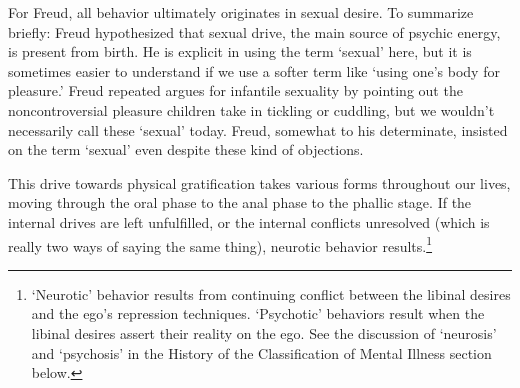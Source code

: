 For Freud, all behavior ultimately originates in sexual desire. To summarize briefly: Freud hypothesized that sexual drive, the main source of psychic energy, is present from birth. He is explicit in using the term `sexual' here, but it is sometimes easier to understand if we use a softer term like `using one's body for pleasure.' Freud repeated argues for infantile sexuality by pointing out the noncontroversial pleasure children take in tickling or cuddling, but we wouldn't necessarily call these `sexual' today. Freud, somewhat to his determinate, insisted on the term `sexual' even despite these kind of objections.

This drive towards physical gratification takes various forms throughout our lives, moving through the oral phase to the anal phase to the phallic stage. If the internal drives are left unfulfilled, or the internal conflicts unresolved (which is really two ways of saying the same thing), neurotic behavior results.\footnote{`Neurotic' behavior results from continuing conflict between the libinal desires and the ego's repression techniques. `Psychotic' behaviors result when the libinal desires assert their reality on the ego. See the discussion of `neurosis' and `psychosis' in the History of the Classification of Mental Illness section below.}

